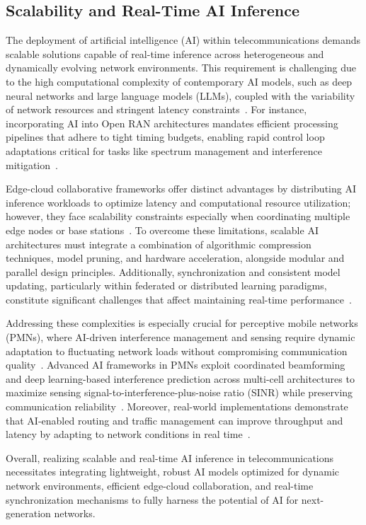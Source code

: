 \documentclass[sigconf]{acmart}
\begin{document}
\subsection{Scalability and Real-Time AI Inference}

The deployment of artificial intelligence (AI) within telecommunications demands scalable solutions capable of real-time inference across heterogeneous and dynamically evolving network environments. This requirement is challenging due to the high computational complexity of contemporary AI models, such as deep neural networks and large language models (LLMs), coupled with the variability of network resources and stringent latency constraints~\cite{ref7,ref49,ref52,ref53}. For instance, incorporating AI into Open RAN architectures mandates efficient processing pipelines that adhere to tight timing budgets, enabling rapid control loop adaptations critical for tasks like spectrum management and interference mitigation~\cite{ref48}. 

Edge-cloud collaborative frameworks offer distinct advantages by distributing AI inference workloads to optimize latency and computational resource utilization; however, they face scalability constraints especially when coordinating multiple edge nodes or base stations~\cite{ref49}. To overcome these limitations, scalable AI architectures must integrate a combination of algorithmic compression techniques, model pruning, and hardware acceleration, alongside modular and parallel design principles. Additionally, synchronization and consistent model updating, particularly within federated or distributed learning paradigms, constitute significant challenges that affect maintaining real-time performance~\cite{ref52}. 

Addressing these complexities is especially crucial for perceptive mobile networks (PMNs), where AI-driven interference management and sensing require dynamic adaptation to fluctuating network loads without compromising communication quality~\cite{ref53}. Advanced AI frameworks in PMNs exploit coordinated beamforming and deep learning-based interference prediction across multi-cell architectures to maximize sensing signal-to-interference-plus-noise ratio (SINR) while preserving communication reliability~\cite{ref48}. Moreover, real-world implementations demonstrate that AI-enabled routing and traffic management can improve throughput and latency by adapting to network conditions in real time~\cite{ref53}. 

Overall, realizing scalable and real-time AI inference in telecommunications necessitates integrating lightweight, robust AI models optimized for dynamic network environments, efficient edge-cloud collaboration, and real-time synchronization mechanisms to fully harness the potential of AI for next-generation networks.
\end{document}
